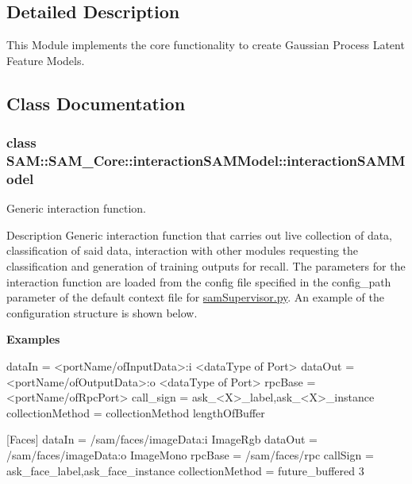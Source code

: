 \subsection{Detailed Description}
This Module implements the core functionality to create Gaussian Process Latent Feature Models. 



\subsection{Class Documentation}
\label{classSAM_1_1SAM__Core_1_1interactionSAMModel_1_1interactionSAMModel}
\subsubsection{class S\+AM\+:\+:S\+A\+M\+\_\+\+Core\+:\+:interaction\+S\+A\+M\+Model\+:\+:interaction\+S\+A\+M\+Model}
Generic interaction function. 

\begin{DoxyParagraph}{Description}
Generic interaction function that carries out live collection of data, classification of said data, interaction with other modules requesting the classification and generation of training outputs for recall. The parameters for the interaction function are loaded from the config file specified in the {\ttfamily config\+\_\+path} parameter of the default context file for \hyperlink{samSupervisor_8py}{sam\+Supervisor.\+py}. An example of the configuration structure is shown below.
\end{DoxyParagraph}
{\bfseries Examples} 
\begin{DoxyCode}
dataIn = <portName/ofInputData>:i <dataType of Port>
dataOut = <portName/ofOutputData>:o <dataType of Port>
rpcBase = <portName/ofRpcPort>
call\_sign = ask\_<X>\_label,ask\_<X>\_instance
collectionMethod = collectionMethod lengthOfBuffer

[Faces]
dataIn = /sam/faces/imageData:i ImageRgb
dataOut = /sam/faces/imageData:o ImageMono
rpcBase = /sam/faces/rpc
callSign = ask\_face\_label,ask\_face\_instance
collectionMethod = future\_buffered 3
\end{DoxyCode}



